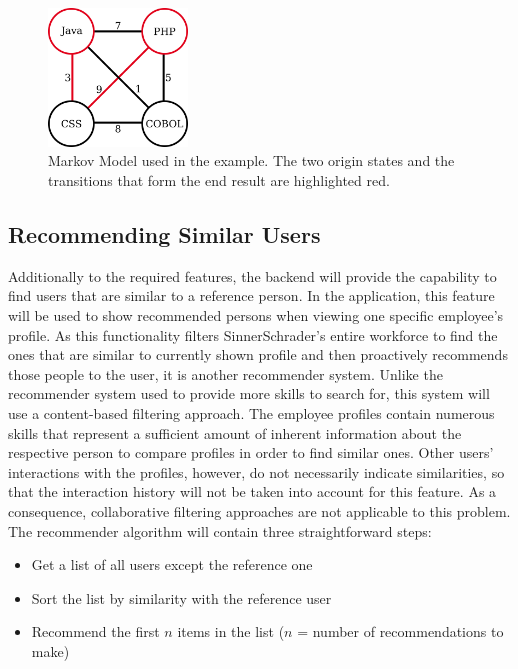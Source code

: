 \begin{figure}[!htp]
    \centering
    \includegraphics[width=0.33\textwidth]{images/markov_impl.png}
    \caption[Diagram: Search Suggestion Markov Model]{Markov Model used in the example. The two origin states and the transitions that form the end result are highlighted red.}
    \label{fig:wireframe}
\end{figure}

\newpage

\subsection{Recommending Similar Users}
\label{similar}
Additionally to the required features, the backend will provide the capability to find users that are similar to a reference person.
In the application, this feature will be used to show recommended persons when viewing one specific employee's profile. As this functionality filters SinnerSchrader's entire workforce to find the ones that are similar to currently shown profile and then proactively recommends those people to the user, it is another recommender system.
Unlike the recommender system used to provide more skills to search for, this system will use a content-based filtering approach. The employee profiles contain numerous skills that represent a sufficient amount of inherent information about the respective person to compare profiles in order to find similar ones. Other users' interactions with the profiles, however, do not necessarily indicate similarities, so that the interaction history will not be taken into account for this feature. As a consequence, collaborative filtering approaches are not applicable to this problem.
The recommender algorithm will contain three straightforward steps:
\begin{itemize}
	\item Get a list of all users except the reference one
	\item Sort the list by similarity with the reference user
	\item Recommend the first $n$ items in the list ($n$ = number of recommendations to make)
\end{itemize}

